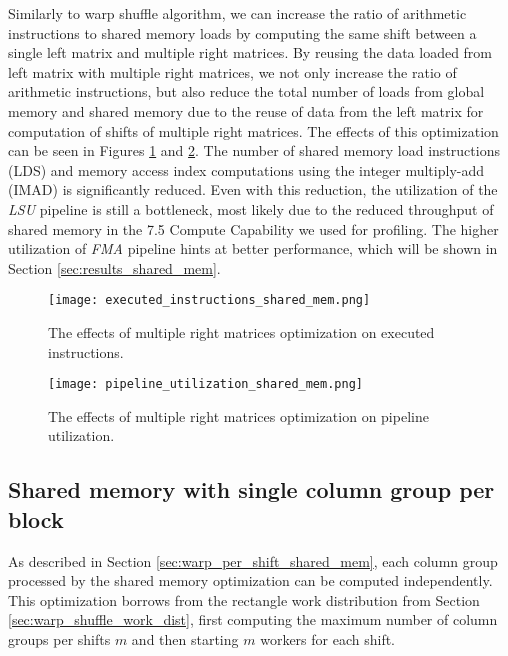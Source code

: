 Similarly to warp shuffle algorithm, we can increase the ratio of arithmetic instructions to shared memory loads by computing the same shift between a single left matrix and multiple right matrices. By reusing the data loaded from left matrix with multiple right matrices, we not only increase the ratio of arithmetic instructions, but also reduce the total number of loads from global memory and shared memory due to the reuse of data from the left matrix for computation of shifts of multiple right matrices. The effects of this optimization can be seen in Figures \ref{fig:executed_instructions_shared_mem} and \ref{fig:pipeline_utilization_shared_mem}. The number of shared memory load instructions (LDS) and memory access index computations using the integer multiply-add (IMAD) is significantly reduced. Even with this reduction, the utilization of the \textit{LSU} pipeline is still a bottleneck, most likely due to the reduced throughput of shared memory in the 7.5 Compute Capability we used for profiling. The higher utilization of \textit{FMA} pipeline hints at better performance, which will be shown in Section \ref{sec:results_shared_mem}.

\begin{figure}[ht]
	\centering
	\texttt{[image: executed\_instructions\_shared\_mem.png]}
	\caption{The effects of multiple right matrices optimization on executed instructions.}
	\label{fig:executed_instructions_shared_mem}
\end{figure}

\begin{figure}[ht]
	\centering
	\texttt{[image: pipeline\_utilization\_shared\_mem.png]}
	\caption{The effects of multiple right matrices optimization on pipeline utilization.}
	\label{fig:pipeline_utilization_shared_mem}
\end{figure}

\subsection{Shared memory with single column group per block}
\label{sec:column_group_per_worker}
As described in Section \ref{sec:warp_per_shift_shared_mem}, each column group processed by the shared memory optimization can be computed independently. This optimization borrows from the rectangle work distribution from Section \ref{sec:warp_shuffle_work_dist}, first computing the maximum number of column groups per shifts $m$ and then starting $m$ workers for each shift.


